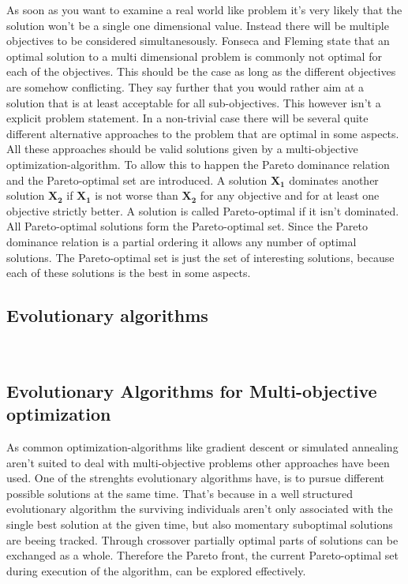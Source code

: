 \documentclass[12pt,twoside]{article}
\theoremstyle{plain}
\theoremstyle{definition}
\theoremstyle{remark}
\begin{document}
As soon as you want to examine a real world like problem it's very likely that the solution won't be a single one dimensional value. Instead there will be multiple objectives to be considered simultanesously.
Fonseca and Fleming \cite{fonseca1995overview} state that an optimal solution to a multi dimensional problem is commonly not optimal for each of the objectives.
This should be the case as long as the different objectives are somehow conflicting.
They say further that you would rather aim at a solution that is at least acceptable for all sub-objectives.
This however isn't a explicit problem statement. In a non-trivial case there will be several quite different alternative approaches to the problem that are optimal in some aspects.
All these approaches should be valid solutions given by a multi-objective optimization-algorithm.
To allow this to happen the Pareto dominance relation and the Pareto-optimal set are introduced.
A solution $\mathbf{X_1}$ dominates another solution $\mathbf{X_2}$ if $\mathbf{X_1}$ is not worse than $\mathbf{X_2}$ for any objective and for at least one objective strictly better. \cite{doncieux2015multi} 
A solution is called Pareto-optimal if it isn't dominated. All Pareto-optimal solutions form the Pareto-optimal set. 
Since the Pareto dominance relation is a partial ordering it allows any number of optimal solutions.
The Pareto-optimal set is just the set of interesting solutions, because each of these solutions is the best in some aspects.

\subsection{Evolutionary algorithms}
\label{back:evo}
\cite{eiben2004introduction}\\

\subsection{Evolutionary Algorithms for Multi-objective optimization}
\label{back:evo_in_multi-opt}
As common optimization-algorithms like gradient descent or simulated annealing aren't suited to deal with multi-objective problems \cite{fonseca1995overview} other approaches have been used.
One of the strenghts evolutionary algorithms have, is to pursue different possible solutions at the same time. That's because in a well structured evolutionary algorithm the surviving individuals aren't only associated with the single best solution at the given time, but also momentary suboptimal solutions are beeing tracked.
Through crossover partially optimal parts of solutions can be exchanged as a whole. 
Therefore the Pareto front, the current Pareto-optimal set during execution of the algorithm, can be explored effectively.
\end{document}
